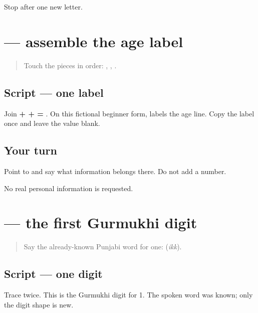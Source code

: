 \begin{tcolorbox}[breakable,colback=teal!4,colframe=teal!35!black,title={Before you move on}]
Stop after one new letter.
\end{tcolorbox}
\section[\texorpdfstring{\pa{ਉਮਰ} (umar)}{ਉਮਰ (umar)}]{ — assemble the age label}

\label{lesson:PA-W07-age-label}



\begin{quote}
Touch the pieces in order: \textbf{}, \textbf{}, \textbf{}.
\end{quote}

\subsection*{Script — one label}
Join \textbf{ +  +  = }. On this fictional beginner form, \textbf{} labels the age line. Copy the label once and leave the value blank.

\subsection*{Your turn}
Point to \textbf{} and say what information belongs there. Do not add a number.

\begin{tcolorbox}[breakable,colback=teal!4,colframe=teal!35!black,title={Before you move on}]
No real personal information is requested.
\end{tcolorbox}
\section[\texorpdfstring{\pa{੧} (one)}{੧ (one)}]{ — the first Gurmukhi digit}

\label{lesson:PA-W07-digit-one}



\begin{quote}
Say the already-known Punjabi word for one: \textbf{} (\emph{ikk}).
\end{quote}

\subsection*{Script — one digit}
Trace \textbf{} twice. This is the Gurmukhi digit for 1. The spoken word was known; only the digit shape is new.

